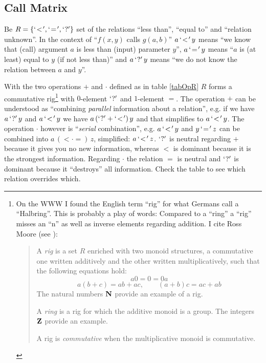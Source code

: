 

\subsection{Call Matrix}
Be $R = \{`\!<\!', `\!=\!', `?'\}$ set of the relations ``less
than'',  ``equal to'' and ``relation unknown''. In the context of
``$f(x,y)$ calls $g(a,b)$'' $a \,`\!<\!'\, y$ means ``we know that (call)
argument $a$ is less than (input) parameter $y$'', $a \,`\!=\!'\, y$ means
``$a$ is (at least) equal to $y$ (if not less than)'' and $a \,`?'\,
y$ means ``we do not know the relation between $a$ and $y$''.

With the two operations
$+$ and $\cdot$ defined as in table \ref{tabOpR} $R$ forms a
commutative
rig\footnote{On the WWW I found the English term
    ``rig'' for what Germans call a ``Halb\-ring''. This is probably a
    play of words: Compared  to a ``ring'' a ``rig'' misses an ``n''
    as well as inverse elements regarding addition. I cite Ross Moore
(see {\tt {}}):
\begin{quote}
A {\em rig} is a set $R$ enriched with two monoid structures, a
commutative one written additively and the other written
multiplicatively, such that the following equations hold:
$$
            a 0 = 0 = 0 a
$$
$$
    a (b + c) = a b + a c, \qquad (a + b) c = a c + a b
$$
The natural numbers $\mathbf{N}$ provide an example of a rig.

A {\em ring} is a rig for which the additive monoid is a group. The
integers  $\mathbf{Z}$ provide an example.

A rig is {\em commutative}  when the multiplicative monoid is commutative.
\end{quote}
}
with $0$-element $`?'$ and $1$-element $\equal$. The operation $+$ can be
understood as ``combining {\em parallel} information about a relation'',
e.g. if we have $a \,`?'\, y$ and $a \,`\!<\!'\, y$ we have $a
\,(`?' + `\!<\!')\, y$ and that simplifies to $a \,`\!<\!'\, y$.
The operation
$\cdot$ however is ``{\em serial} combination'', e.g. $a \,`\!<\!'\, y$
and $y \,`\!=\!'\, z$ can be combined into $a \,(\less \cdot \equal)\, z$,
simplified: $a \,`\!<\!'\, z$. $`?'$ is neutral regarding $+$ because
it gives you no new information, whereas $\less$ is dominant because
it is the strongest information. Regarding $\cdot$ the relation
$\equal$ is neutral
and $`?'$ is dominant because it ``destroys'' all
information. Check the table to see which relation overrides which.

